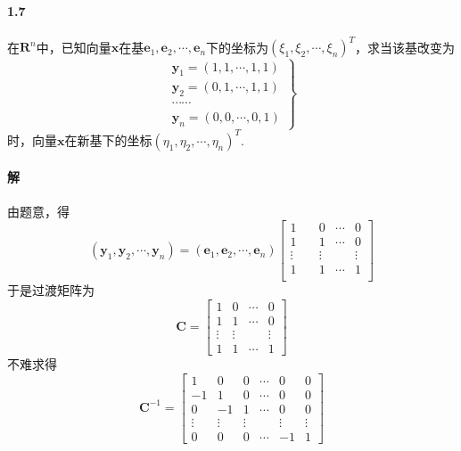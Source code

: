 \documentclass[12pt, a4paper, oneside, fontset=none]{ctexart}
\begin{document}
\paragraph*{1.7} 在$\mathbf{R}^n$中，已知向量$\bm{x}$在基$\bm{e}_1,\bm{e}_2, \cdots ,\bm{e}_n$下的坐标为$(\xi_1, \xi_2, \cdots , \xi_n)^T$，求当该基改变为
\[
    \left.
    \begin{matrix}
        \bm{y}_1 = (1,1,\cdots,1,1) \\
        \bm{y}_2 = (0,1,\cdots,1,1) \\
        \cdots \cdots               \\
        \bm{y}_n = (0,0,\cdots,0,1)
    \end{matrix}
    \right\}
\]
时，向量$\bm{x}$在新基下的坐标$(\eta_1, \eta_2, \cdots , \eta_n)^T$.

\paragraph*{解} 由题意，得
\[
    (\bm{y}_1, \bm{y}_2, \cdots, \bm{y}_n) = (\bm{e}_1, \bm{e}_2, \cdots, \bm{e}_n) \begin{bmatrix}
        1      \quad      & 0           & \bm{\cdots} & 0           \\
        1      \quad      & 1           & \bm{\cdots} & 0           \\
        \bm{\vdots} \quad & \bm{\vdots} &             & \bm{\vdots} \\
        1      \quad      & 1           & \bm{\cdots} & 1           \\
    \end{bmatrix}
\]
于是过渡矩阵为
\[
    \bm{C} = \begin{bmatrix}
        1           & 0           & \bm{\cdots} & 0           \\
        1           & 1           & \bm{\cdots} & 0           \\
        \bm{\vdots} & \bm{\vdots} &             & \bm{\vdots} \\
        1           & 1           & \bm{\cdots} & 1
    \end{bmatrix}
\]
不难求得
\[
    \bm{C}^{-1} = \begin{bmatrix}
        1           & 0           & 0           & \bm{\cdots} & 0           & 0           \\
        -1          & 1           & 0           & \bm{\cdots} & 0           & 0           \\
        0           & -1          & 1           & \bm{\cdots} & 0           & 0           \\
        \bm{\vdots} & \bm{\vdots} & \bm{\vdots} &             & \bm{\vdots} & \bm{\vdots} \\
        0           & 0           & 0           & \bm{\cdots} & -1          & 1
    \end{bmatrix}
\]
\end{document}
